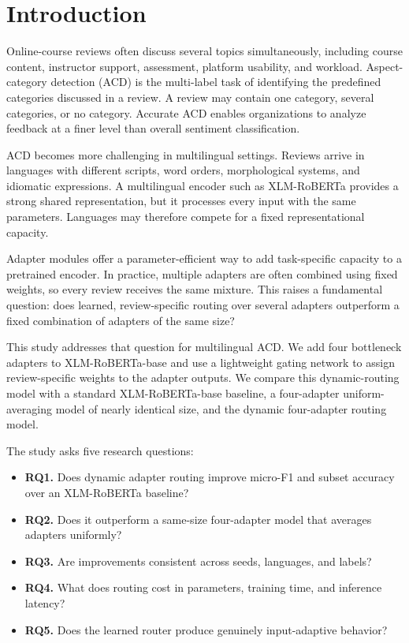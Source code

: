 \documentclass[review,12pt]{elsarticle}
\begin{document}
\section{Introduction}
Online-course reviews often discuss several topics simultaneously, including course content, instructor support, assessment, platform usability, and workload. Aspect-category detection (ACD) is the multi-label task of identifying the predefined categories discussed in a review. A review may contain one category, several categories, or no category. Accurate ACD enables organizations to analyze feedback at a finer level than overall sentiment classification.

ACD becomes more challenging in multilingual settings. Reviews arrive in languages with different scripts, word orders, morphological systems, and idiomatic expressions. A multilingual encoder such as XLM-RoBERTa provides a strong shared representation, but it processes every input with the same parameters. Languages may therefore compete for a fixed representational capacity.

Adapter modules offer a parameter-efficient way to add task-specific capacity to a pretrained encoder. In practice, multiple adapters are often combined using fixed weights, so every review receives the same mixture. This raises a fundamental question: does learned, review-specific routing over several adapters outperform a fixed combination of adapters of the same size?

This study addresses that question for multilingual ACD. We add four bottleneck adapters to XLM-RoBERTa-base and use a lightweight gating network to assign review-specific weights to the adapter outputs. We compare this dynamic-routing model with a standard XLM-RoBERTa-base baseline, a four-adapter uniform-averaging model of nearly identical size, and the dynamic four-adapter routing model.

The study asks five research questions:
\begin{itemize}
\item \textbf{RQ1.} Does dynamic adapter routing improve micro-F1 and subset accuracy over an XLM-RoBERTa baseline?
\item \textbf{RQ2.} Does it outperform a same-size four-adapter model that averages adapters uniformly?
\item \textbf{RQ3.} Are improvements consistent across seeds, languages, and labels?
\item \textbf{RQ4.} What does routing cost in parameters, training time, and inference latency?
\item \textbf{RQ5.} Does the learned router produce genuinely input-adaptive behavior?
\end{itemize}
\end{document}
